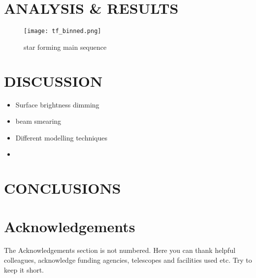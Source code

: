 \documentclass[a4paper,fleqn,usenatbib]{mn2e}
\begin{document}
\section{ANALYSIS \& RESULTS}\label{sec:results}

\begin{figure}
\centering
\texttt{[image: tf\_binned.png]}
\caption{star forming main sequence}
\label{fig:distributions}
\end{figure}


\section{DISCUSSION}\label{sec:discussion}

\begin{itemize}
    \item Surface brightness dimming
    \item beam smearing
    \item Different modelling techniques
    \item 
\end{itemize}

\section{CONCLUSIONS}\label{sec:conclusions}



\section*{Acknowledgements}

The Acknowledgements section is not numbered. Here you can thank helpful
colleagues, acknowledge funding agencies, telescopes and facilities used etc.
Try to keep it short.




%


\clearpage 

%

\end{document}
